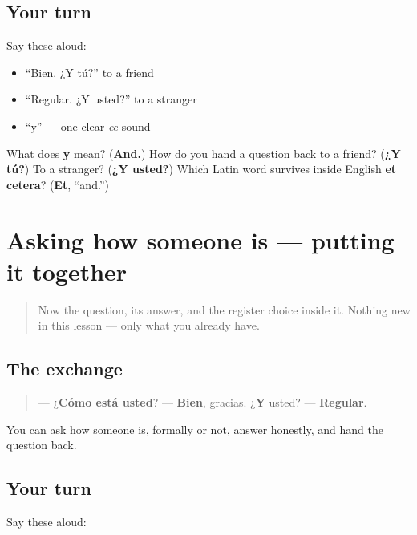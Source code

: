 \subsection*{Your turn}
Say these aloud:

\begin{itemize}
\raggedright
  \item “Bien. ¿Y tú?” to a friend
  \item “Regular. ¿Y usted?” to a stranger
  \item “y” — one clear \emph{ee} sound
\end{itemize}

\begin{tcolorbox}[breakable,colback=teal!4,colframe=teal!35!black,title={Before you move on}]
What does \textbf{y} mean? (\textbf{And.}) How do you hand a question back to a friend? (\textbf{¿Y tú?}) To a stranger? (\textbf{¿Y usted?}) Which Latin word survives inside English \textbf{et cetera}? (\textbf{Et}, “and.”)
\end{tcolorbox}
\section[Practice]{Asking how someone is — putting it together}

\label{lesson:ES-C04-repaso-estar}



\begin{quote}
Now the question, its answer, and the register choice inside it. Nothing new in this lesson — only what you already have.
\end{quote}

\subsection*{The exchange}
\begin{quote}
— ¿\textbf{Cómo está usted}? — \textbf{Bien}, gracias. ¿\textbf{Y} usted? — \textbf{Regular}.
\end{quote}

\begin{grammarlens}[title={What you've built}]
You can ask how someone is, formally or not, answer honestly, and hand the question back.
\end{grammarlens}

\subsection*{Your turn}
Say these aloud:

